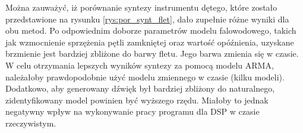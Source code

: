 Można zauważyć, iż porównanie syntezy instrumentu dętego, które zostało przedstawione na rysunku \ref{rys:por_synt_flet}, dało zupełnie różne wyniki dla obu metod. Po odpowiednim doborze parametrów modelu falowodowego, takich jak wzmocnienie sprzężenia pętli zamkniętej oraz wartość opóźnienia, uzyskane brzmienie jest bardziej zbliżone do barwy fletu. Jego barwa zmienia się w czasie. W celu otrzymania lepszych wyników syntezy za pomocą modelu ARMA, należałoby prawdopodobnie użyć modelu zmiennego w czasie (kilku modeli). Dodatkowo, aby generowany dźwięk był bardziej zbliżony do naturalnego, zidentyfikowany model powinien być wyższego rzędu. Miałoby to jednak negatywny wpływ na wykonywanie pracy programu dla DSP w czasie rzeczywistym.

